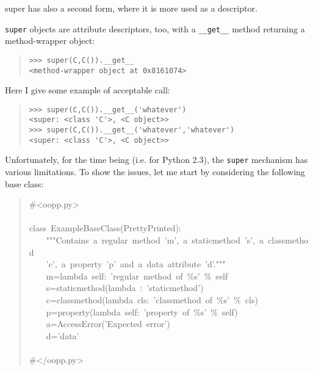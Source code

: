 \documentclass[10pt,english]{article}
\begin{document}
super has also a second form, where it is more used as a descriptor.

\texttt{super} objects are attribute descriptors, too, with a \texttt{{\_}{\_}get{\_}{\_}}
method returning a method-wrapper object:
\begin{quote}
\begin{verbatim}>>> super(C,C()).__get__
<method-wrapper object at 0x8161074>\end{verbatim}
\end{quote}

Here I give some example of acceptable call:
\begin{quote}
\begin{verbatim}>>> super(C,C()).__get__('whatever')
<super: <class 'C'>, <C object>>
>>> super(C,C()).__get__('whatever','whatever')
<super: <class 'C'>, <C object>>\end{verbatim}
\end{quote}

Unfortunately, for the time being 
(i.e. for Python 2.3), the \texttt{super} mechanism  has various limitations. 
To show the issues, let me start by  considering the following base class:
\begin{quote}
\begin{ttfamily}\begin{flushleft}
\mbox{{\#}<oopp.py>}\\
\mbox{}\\
\mbox{class~ExampleBaseClass(PrettyPrinted):}\\
\mbox{~~~~"""Contains~a~regular~method~'m',~a~staticmethod~'s',~a~classmethod~}\\
\mbox{~~~~'c',~a~property~'p'~and~a~data~attribute~'d'."""}\\
\mbox{~~~~m=lambda~self:~'regular~method~of~{\%}s'~{\%}~self}\\
\mbox{~~~~s=staticmethod(lambda~:~'staticmethod')}\\
\mbox{~~~~c=classmethod(lambda~cls:~'classmethod~of~{\%}s'~{\%}~cls)}\\
\mbox{~~~~p=property(lambda~self:~'property~of~{\%}s'~{\%}~self)}\\
\mbox{~~~~a=AccessError('Expected~error')}\\
\mbox{~~~~d='data'}\\
\mbox{}\\
\mbox{{\#}</oopp.py>}
\end{flushleft}\end{ttfamily}
\end{quote}
\end{document}
